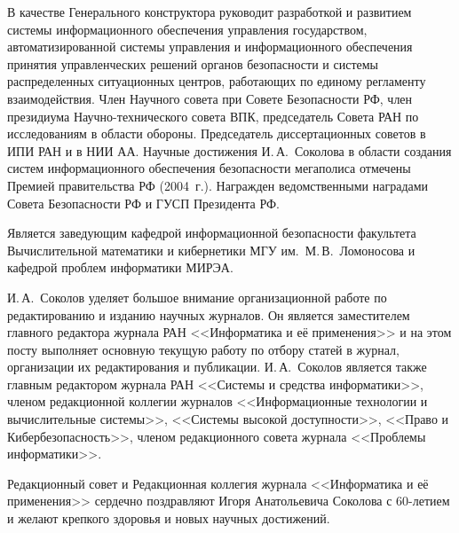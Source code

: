 \begin{multicols}{2}
В качестве Генерального конструктора руководит разработкой и развитием
системы информа\-ци\-онного обеспечения управления государством,
автоматизированной сис\-те\-мы управ\-ле\-ния и информационного обеспечения
принятия управленческих решений органов безопасности и системы распределенных
ситуационных центров, работа\-ющих по единому регламенту взаимодействия.
Член Научного совета при Совете Безопасности РФ, член президиума
На\-уч\-но-тех\-ни\-че\-ско\-го совета ВПК, председатель Совета РАН по
исследованиям в области обороны. Председатель диссертационных советов в ИПИ РАН
и в НИИ АА. Научные достижения И.\,А.~Соколова в области создания сис\-тем
информационного обеспечения безопасности мегаполиса отмечены Премией правительства
РФ (2004~г.). Награжден ведомственными наградами Совета Безопасности РФ и ГУСП
 Президента РФ.

Является заведующим кафедрой информационной безопасности факультета Вычислительной математики и кибернетики МГУ им.\ М.\,В.~Ломоносова и кафедрой проблем информатики МИРЭА.

И.\,А.~Соколов уделяет большое внимание организационной работе по
редактированию и изданию научных журналов. Он является заместителем главного
редактора журнала РАН <<Информатика и её применения>> и на этом посту
выполняет основную текущую работу по отбору статей в журнал, организации их
редактирования и публикации. И.\,А.~Соколов является также главным редактором
журнала РАН <<Системы и средства информатики>>, членом редакционной
коллегии журналов <<Информационные технологии и вычислительные системы>>,
<<Сис\-те\-мы высокой доступности>>, <<Право и Кибер\-без\-опас\-ность>>, членом
редакционного совета журнала <<Проб\-ле\-мы информатики>>.

\bigskip

Редакционный совет и Редакционная коллегия журнала <<Информатика и её применения>> сердечно поздравляют Игоря Анатольевича Соколова с 60-ле\-ти\-ем и желают крепкого здоровья и новых научных достижений.




\end{multicols}

